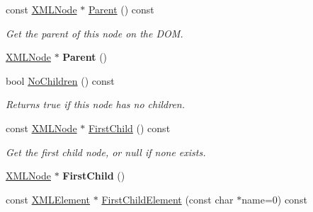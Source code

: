 \begin{DoxyCompactItemize}
\mbox{\label{classtinyxml2_1_1_x_m_l_node_ae0f62bc186c56c2e0483ebd52dbfbe34}} 
const \mbox{\hyperlink{classtinyxml2_1_1_x_m_l_node}{X\+M\+L\+Node}} $\ast$ \mbox{\hyperlink{classtinyxml2_1_1_x_m_l_node_ae0f62bc186c56c2e0483ebd52dbfbe34}{Parent}} () const
\begin{DoxyCompactList}\small\item\em Get the parent of this node on the D\+OM. \end{DoxyCompactList}\item 
\mbox{\label{classtinyxml2_1_1_x_m_l_node_a76029693a5a54fbb721a41d7a0ca8a97}} 
\mbox{\hyperlink{classtinyxml2_1_1_x_m_l_node}{X\+M\+L\+Node}} $\ast$ {\bfseries Parent} ()
\item 
\mbox{\label{classtinyxml2_1_1_x_m_l_node_ac3ab489e6e202a3cd1762d3b332e89d4}} 
bool \mbox{\hyperlink{classtinyxml2_1_1_x_m_l_node_ac3ab489e6e202a3cd1762d3b332e89d4}{No\+Children}} () const
\begin{DoxyCompactList}\small\item\em Returns true if this node has no children. \end{DoxyCompactList}\item 
\mbox{\label{classtinyxml2_1_1_x_m_l_node_ae7dc225e1018cdd685f7563593a1fe08}} 
const \mbox{\hyperlink{classtinyxml2_1_1_x_m_l_node}{X\+M\+L\+Node}} $\ast$ \mbox{\hyperlink{classtinyxml2_1_1_x_m_l_node_ae7dc225e1018cdd685f7563593a1fe08}{First\+Child}} () const
\begin{DoxyCompactList}\small\item\em Get the first child node, or null if none exists. \end{DoxyCompactList}\item 
\mbox{\label{classtinyxml2_1_1_x_m_l_node_a2d6c70c475146b48bc93a7fafdeff5e0}} 
\mbox{\hyperlink{classtinyxml2_1_1_x_m_l_node}{X\+M\+L\+Node}} $\ast$ {\bfseries First\+Child} ()
\item 
const \mbox{\hyperlink{classtinyxml2_1_1_x_m_l_element}{X\+M\+L\+Element}} $\ast$ \mbox{\hyperlink{classtinyxml2_1_1_x_m_l_node_a1bec132dcf085284e0a10755f2cf0d57}{First\+Child\+Element}} (const char $\ast$name=0) const
\item 

\end{DoxyCompactItemize}
